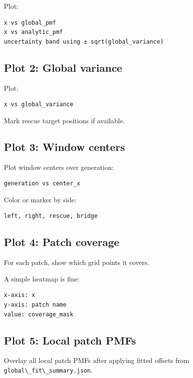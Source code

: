 \documentclass[
  10.5pt,
]{article}
\newcommand{\passthrough}[1]{#1}
\begin{document}
Plot:

\begin{lstlisting}
x vs global_pmf
x vs analytic_pmf
uncertainty band using ± sqrt(global_variance)
\end{lstlisting}

\subsection{Plot 2: Global variance}\label{plot-2-global-variance}

Plot:

\begin{lstlisting}
x vs global_variance
\end{lstlisting}

Mark rescue target positions if available.

\subsection{Plot 3: Window centers}\label{plot-3-window-centers}

Plot window centers over generation:

\begin{lstlisting}
generation vs center_x
\end{lstlisting}

Color or marker by side:

\begin{lstlisting}
left, right, rescue, bridge
\end{lstlisting}

\subsection{Plot 4: Patch coverage}\label{plot-4-patch-coverage}

For each patch, show which grid points it covers.

A simple heatmap is fine:

\begin{lstlisting}
x-axis: x
y-axis: patch name
value: coverage_mask
\end{lstlisting}

\subsection{Plot 5: Local patch PMFs}\label{plot-5-local-patch-pmfs}

Overlay all local patch PMFs after applying fitted offsets from
\passthrough{\lstinline!global\_fit\_summary.json!}.
\end{document}
